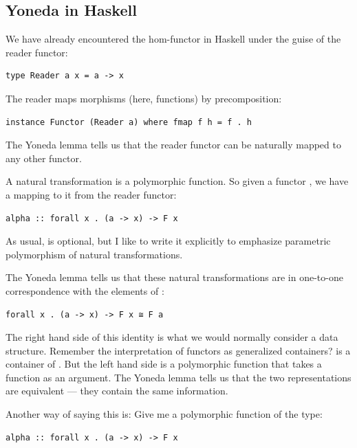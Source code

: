 \subsection{Yoneda in Haskell}\label{yoneda-in-haskell}

We have already encountered the hom-functor in Haskell under the guise
of the reader functor:

\begin{verbatim}
type Reader a x = a -> x
\end{verbatim}

The reader maps morphisms (here, functions) by precomposition:

\begin{verbatim}
instance Functor (Reader a) where fmap f h = f . h
\end{verbatim}

The Yoneda lemma tells us that the reader functor can be naturally
mapped to any other functor.

A natural transformation is a polymorphic function. So given a functor
, we have a mapping to it from the reader functor:

\begin{verbatim}
alpha :: forall x . (a -> x) -> F x
\end{verbatim}

As usual,  is optional, but I like to write it explicitly
to emphasize parametric polymorphism of natural transformations.

The Yoneda lemma tells us that these natural transformations are in
one-to-one correspondence with the elements of :

\begin{verbatim}
forall x . (a -> x) -> F x ≅ F a
\end{verbatim}

The right hand side of this identity is what we would normally consider
a data structure. Remember the interpretation of functors as generalized
containers?  is a container of . But the left
hand side is a polymorphic function that takes a function as an
argument. The Yoneda lemma tells us that the two representations are
equivalent --- they contain the same information.

Another way of saying this is: Give me a polymorphic function of the
type:

\begin{verbatim}
alpha :: forall x . (a -> x) -> F x
\end{verbatim}

